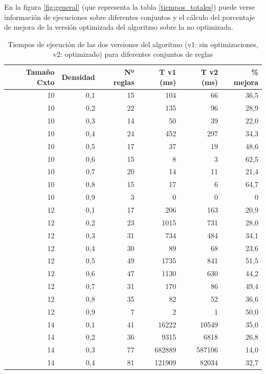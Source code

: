 	En la figura \ref{fig:general} (que representa la tabla \ref{tiempos_totales}) puede verse información de ejecuciones sobre diferentes conjuntos y el cálculo del porcentaje de mejora de la versión optimizada del algoritmo sobre la no optimizada.
	

	\begin{table}[htbp]
		\caption{Tiempos de ejecución de las dos versiones del algoritmo (v1: sin optimizaciones, v2: optimizado) para diferentes conjuntos de reglas}
		\begin{center}
			\begin{tabular}{|r|r|r|r|r|r|}
				\hline
				Tamaño Cxto & Densidad & Nº reglas & T v1 (ms) & T v2 (ms) & \% mejora \\ \hline
					\hline
				10 & 0,1 & 15 & 104 & 66 & 36,5 \\ \hline
				10 & 0,2 & 22 & 135 & 96 & 28,9 \\ \hline
				10 & 0,3 & 14 & 50 & 39 & 22,0 \\ \hline
				10 & 0,4 & 24 & 452 & 297 & 34,3 \\ \hline
				10 & 0,5 & 17 & 37 & 19 & 48,6 \\ \hline
				10 & 0,6 & 15 & 8 & 3 & 62,5 \\ \hline
				10 & 0,7 & 20 & 14 & 11 & 21,4 \\ \hline
				10 & 0,8 & 15 & 17 & 6 & 64,7 \\ \hline
				10 & 0,9 & 3 & 0 & 0 & 0 \\ \hline
				12 & 0,1 & 17 & 206 & 163 & 20,9 \\ \hline
				12 & 0,2 & 23 & 1015 & 731 & 28,0 \\ \hline
				12 & 0,3 & 31 & 734 & 484 & 34,1 \\ \hline
				12 & 0,4 & 30 & 89 & 68 & 23,6 \\ \hline
				12 & 0,5 & 49 & 1735 & 841 & 51,5 \\ \hline
				12 & 0,6 & 47 & 1130 & 630 & 44,2 \\ \hline
				12 & 0,7 & 31 & 170 & 86 & 49,4 \\ \hline
				12 & 0,8 & 35 & 82 & 52 & 36,6 \\ \hline
				12 & 0,9 & 7 & 2 & 1 & 50,0 \\ \hline
				14 & 0,1 & 41 & 16222 & 10549 & 35,0 \\ \hline
				14 & 0,2 & 36 & 9315 & 6818 & 26,8 \\ \hline
				14 & 0,3 & 77 & 682889 & 587106 & 14,0 \\ \hline
				14 & 0,4 & 81 & 121909 & 82034 & 32,7 \\ \hline

\end{tabular}
\end{center}
\end{table}
